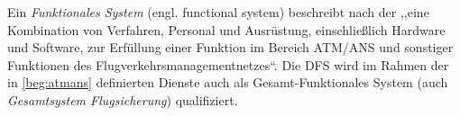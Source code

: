Ein \textit{Funktionales System} (engl. functional system) beschreibt nach der  ,,eine Kombination von Verfahren, Personal und Ausrüstung, einschließlich Hardware und Software, zur Erfüllung einer Funktion im Bereich \acs{ATM}/\acs{ANS} und sonstiger Funktionen des Flugverkehrsmanagementnetzes``.
\cite[Anh. I Abs. 56]{2017R0373}
Die \acf{DFS} wird im Rahmen der in \ref{beg:atmans} definierten Dienste auch als Gesamt-Funktionales System (auch \textit{Gesamtsystem Flugsicherung}) qualifiziert.
\cite[17]{ba_technik}


